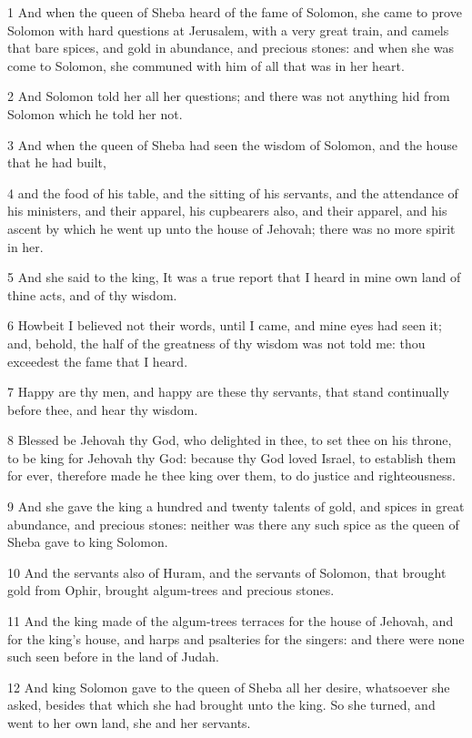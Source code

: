 \par 1 And when the queen of Sheba heard of the fame of Solomon, she came to prove Solomon with hard questions at Jerusalem, with a very great train, and camels that bare spices, and gold in abundance, and precious stones: and when she was come to Solomon, she communed with him of all that was in her heart.
\par 2 And Solomon told her all her questions; and there was not anything hid from Solomon which he told her not.
\par 3 And when the queen of Sheba had seen the wisdom of Solomon, and the house that he had built,
\par 4 and the food of his table, and the sitting of his servants, and the attendance of his ministers, and their apparel, his cupbearers also, and their apparel, and his ascent by which he went up unto the house of Jehovah; there was no more spirit in her.
\par 5 And she said to the king, It was a true report that I heard in mine own land of thine acts, and of thy wisdom.
\par 6 Howbeit I believed not their words, until I came, and mine eyes had seen it; and, behold, the half of the greatness of thy wisdom was not told me: thou exceedest the fame that I heard.
\par 7 Happy are thy men, and happy are these thy servants, that stand continually before thee, and hear thy wisdom.
\par 8 Blessed be Jehovah thy God, who delighted in thee, to set thee on his throne, to be king for Jehovah thy God: because thy God loved Israel, to establish them for ever, therefore made he thee king over them, to do justice and righteousness.
\par 9 And she gave the king a hundred and twenty talents of gold, and spices in great abundance, and precious stones: neither was there any such spice as the queen of Sheba gave to king Solomon.
\par 10 And the servants also of Huram, and the servants of Solomon, that brought gold from Ophir, brought algum-trees and precious stones.
\par 11 And the king made of the algum-trees terraces for the house of Jehovah, and for the king's house, and harps and psalteries for the singers: and there were none such seen before in the land of Judah.
\par 12 And king Solomon gave to the queen of Sheba all her desire, whatsoever she asked, besides that which she had brought unto the king. So she turned, and went to her own land, she and her servants.
